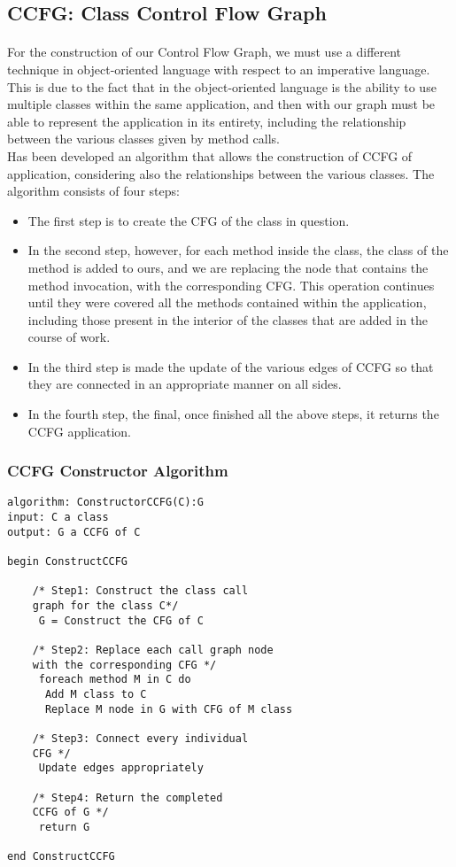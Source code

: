 \documentclass[letterpaper,twocolumn,10pt]{article}
\begin{document}
\subsection{CCFG: Class Control Flow Graph~\cite{CCFG}}
\paragraph{}
For the construction of our Control Flow Graph, we must use a different technique in object-oriented language with respect to an imperative language. This is due to the fact that in the object-oriented language is the ability to use multiple classes within the same application, and then with our graph must be able to represent the application in its entirety, including the relationship between the various classes given by method calls.\\
Has been developed an algorithm that allows the construction of CCFG of application, considering also the relationships between the various classes. The algorithm consists of four steps:
\begin{itemize}
\item The first step is to create the CFG of the class in question. 
\item In the second step, however, for each method inside the class, the class of the method is added to ours, and we are replacing the node that contains the method invocation, with the corresponding CFG. This operation continues until they were covered all the methods contained within the application, including those present in the interior of the classes that are added in the course of work.  
\item In the third step is made the update of the various edges of CCFG so that they are connected in an appropriate manner on all sides.
\item In the fourth step, the final, once finished all the above steps, it returns the CCFG application.
\end{itemize}

\subsubsection{CCFG Constructor Algorithm}
\lstset{basicstyle=\small\ttfamily, tabsize=2}
\begin{lstlisting}
algorithm: ConstructorCCFG(C):G
input: C a class
output: G a CCFG of C

begin ConstructCCFG
	
	/* Step1: Construct the class call 
	graph for the class C*/ 
	 G = Construct the CFG of C
	  
	/* Step2: Replace each call graph node 
	with the corresponding CFG */
	 foreach method M in C do
	  Add M class to C	  
	  Replace M node in G with CFG of M class

	/* Step3: Connect every individual 
	CFG */
	 Update edges appropriately 

	/* Step4: Return the completed 
	CCFG of G */
	 return G

end ConstructCCFG
\end{lstlisting}
\end{document}
